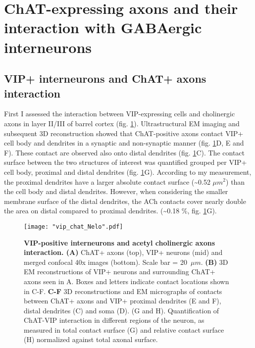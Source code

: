 \section{ChAT-expressing axons and their interaction with GABAergic interneurons}
\label{sec:GABA+ChAT}
\subsection{VIP+ interneurons and ChAT+ axons interaction}
\label{subsec:vip+chat}
First I assessed the interaction between VIP-expressing cells and cholinergic axons in layer II/III of barrel cortex (fig. \ref{fig:vip_chat}). Ultrastructural EM imaging and subsequent 3D reconstruction showed that ChAT-positive axons contact VIP+ cell body and dendrites in a synaptic and non-synaptic manner (fig. \ref{fig:vip_chat}D, E and F). These contact are observed also onto distal dendrites (fig. \ref{fig:vip_chat}C). The contact surface between the two structures of interest was quantified grouped per VIP+ cell body, proximal and distal dendrites (fig. \ref{fig:vip_chat}G). According to my measurement, the proximal dendrites have a larger absolute contact surface (\textasciitilde 0.52 $\mu m^2$) than the cell body and distal dendrites. However, when considering the smaller membrane surface of the distal dendrites, the ACh contacts cover nearly double the area on distal compared to proximal dendrites. (\textasciitilde 0.18 \%, fig. \ref{fig:vip_chat}G). 
\begin{figure}[!h]
	\captionsetup[figure]{indentation=0pt}
	\texttt{[image: "vip\_chat\_Nelo".pdf]}
	\caption[Schematic illustration of the imaging chamber]{\textbf{VIP-positive interneurons and acetyl cholinergic axons interaction. (A)} ChAT+ axons (top), VIP+ neurons (mid) and merged confocal 40x images (bottom). Scale bar = 20~$\mu m$. \textbf{(B)} 3D EM reconstructions of VIP+ neurons and surrounding ChAT+ axons seen in A. Boxes and letters indicate contact locations shown in C-F. \textbf{C-F} 3D reconstructions and EM micrographs of contacts between ChAT+ axons and VIP+ proximal dendrites (E and F), distal dendrites (C) and soma (D). (G and H). Quantification of ChAT-VIP interaction in different regions of the neuron, as measured in total contact surface (G) and relative contact surface (H) normalized against total axonal surface.}
	\label{fig:vip_chat}
\end{figure}
